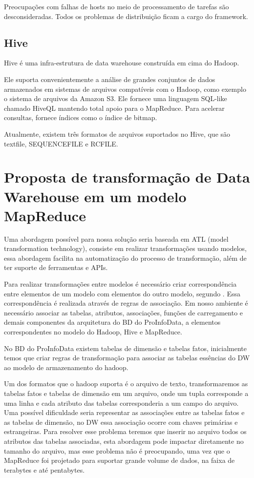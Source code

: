 \documentclass[a4paper,12pt]{article}
\begin{document}
Preocupações com falhas de hosts no meio de processamento de tarefas são
desconsideradas. Todos os problemas de distribuição ficam a cargo do framework.

\subsection{\textbf{Hive}}
Hive é uma infra-estrutura de data warehouse construída em cima do Hadoop. 

Ele suporta convenientemente a análise de grandes conjuntos de dados armazenados
em sistemas de arquivos compatíveis com o Hadoop,  como exemplo o sistema de
arquivos  da Amazon S3. Ele fornece uma linguagem SQL-like chamado HiveQL
mantendo total apoio para o MapReduce. Para acelerar consultas, fornece índices
como o índice de bitmap.
 
Atualmente, existem três formatos de arquivos suportados no Hive, que são
textfile, SEQUENCEFILE e RCFILE.

\section{\textbf{Proposta de transformação de Data Warehouse em um modelo MapReduce}}

Uma abordagem possível para nossa solução seria baseada em ATL (model
transformation technology), consiste em realizar transformações usando modelos,
essa abordagem facilita na automatização do processo de transformação, além de
ter suporte de ferramentas e APIs.

Para realizar transformações entre modelos é necessário criar correspondência
entre elementos de um modelo com elementos do outro modelo, segundo \cite{Didonet}.
Essa correspondência é realizada através de regras de associação. Em nosso
ambiente é necessário associar as tabelas, atributos, associações, funções de
carregamento e demais componentes da arquitetura do BD do ProInfoData, a
elementos correspondentes no modelo do Hadoop, Hive e MapReduce.

No BD do ProInfoData existem tabelas de dimensão e tabelas fatos, inicialmente
temos que criar regras de transformação para associar as tabelas essências do
DW ao modelo de armazenamento do hadoop.

Um dos formatos que o hadoop suporta é o arquivo de texto, transformaremos as
tabelas fatos e tabelas de dimensão em um arquivo, onde um tupla corresponde a
uma linha e cada atributo das tabelas corresponderia a um campo do arquivo. Uma
possível dificuldade seria representar as associações entre as tabelas fatos e
as tabelas de dimensão, no DW essa associação ocorre com chaves primárias e
estrangeiras. Para resolver esse problema teremos que inserir no arquivo todos
os atributos das tabelas associadas, esta abordagem pode impactar diretamente no
tamanho do arquivo, mas esse problema não é preocupando, uma vez que o MapReduce
foi projetado para suportar grande volume de dados, na faixa de terabytes e até
pentabytes.
\end{document}
